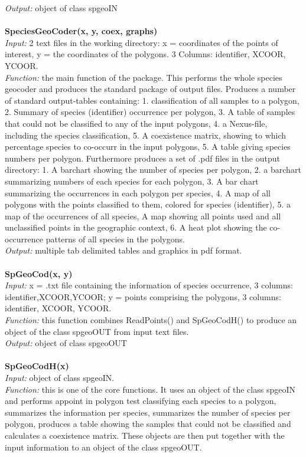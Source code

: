 \documentclass[a4paper,titlepage,11pt]{scrreprt}
\begin{document}
\textit{Output:} object of class spgeoIN\\
\\
\textbf{SpeciesGeoCoder(x, y, coex, graphs)}\\
\textit{Input:} 2 text files in the working directory: x = coordinates of the points of interest, y = the coordinates of the polygons. 3 Columns: identifier, XCOOR, YCOOR.\\
\textit{Function:} the main function of the package. This performs the whole species geocoder and produces the standard package of output files. Produces a number of standard output-tables containing: 1. classification of all samples to a polygon, 2. Summary of species (identifier) occurrence per polygon, 3. A table of samples that could not be classified to any of the input polygons, 4. a Nexus-file, including the species classification, 5. A coexistence matrix, showing to which percentage species to co-occurr in the input polygons, 5. A table giving species numbers per polygon. Furthermore produces a set of .pdf files in the output directory: 1. A barchart showing the number of species per polygon, 2. a barchart summarizing numbers of each species for each polygon, 3. A bar chart summarizing the occurrences in each polygon per species, 4. A map of all polygons with the points classified to them, colored for species (identifier), 5. a map of the occurrences of all species, A map showing all points used and all unclassified points in the geographic context, 6. A heat plot showing the co-occurrence patterns of all species in the polygons.\\
\textit{Output:} multiple tab delimited tables and graphics in pdf format.\\
\\
\textbf{SpGeoCod(x, y)}\\
\textit{Input:} x = .txt file containing the information of species occurrence, 3 columns: identifier,XCOOR,YCOOR; y = points comprising the polygons, 3 columns: identifier, XCOOR, YCOOR.\\
\textit{Function:} this function combines ReadPoints() and SpGeoCodH() to produce an object of the class spgeoOUT from input text files.\\
\textit{Output:} object of class spgeoOUT\\
\\
\textbf{SpGeoCodH(x)}\\
\textit{Input:} object of class spgeoIN.\\
\textit{Function:} this is one of the core functions. It uses an object of the class spgeoIN and performs appoint in polygon test classifying each species to a polygon, summarizes the information per species, summarizes the number of species per polygon, produces a table  showing the samples that could not be classified and calculates a coexistence matrix. These objects are then put together with the input information to an object of the class spgeoOUT.\\
\end{document}
